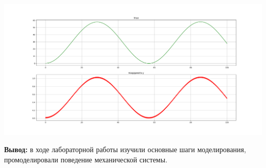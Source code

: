 \documentclass[a4paper,14pt]{extarticle}
\begin{document}
\begin{enumerate}[1. ]
\begin{center}
\includegraphics[width=200mm]{graphs.png}
\end{center}

\end{enumerate}

\textbf{Вывод: } в ходе лабораторной работы изучили основные шаги моделирования,
промоделировали поведение механической системы.
\end{document}

